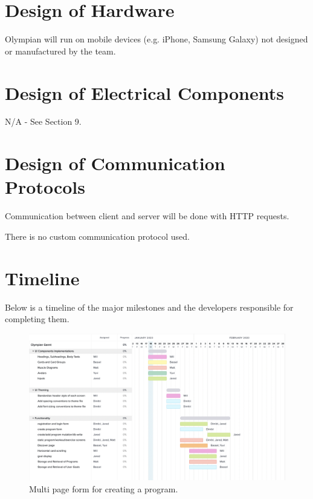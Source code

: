 \documentclass[12pt, titlepage]{article}
\begin{document}
	\section{Design of Hardware}
	
	Olympian will run on mobile devices (e.g. iPhone, Samsung Galaxy) not designed or manufactured by the team.
	
	\section{Design of Electrical Components}
	
	N/A - See Section 9.
	
	\section{Design of Communication Protocols}
	
	Communication between client and server will be done with HTTP requests.

	There is no custom communication protocol used.
	
	\section{Timeline}

  Below is a timeline of the major milestones and the developers responsible for completing them.

  \begin{figure}[H]
		\centering
		\includegraphics[width=\linewidth,keepaspectratio]{gantt_chart}
    \caption{Multi page form for creating a program.}
	\end{figure}
	
	
	
\end{document}

